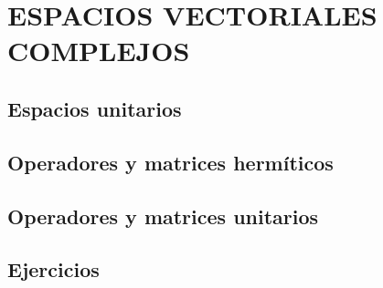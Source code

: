 \chapter[ESPACIOS VECTORIALES COMPLEJOS]{ESPACIOS VECTORIALES \\ COMPLEJOS}\label{chap:espacios_complejos}
\printchaptertableofcontents

\section{Espacios unitarios}

\section{Operadores y matrices hermíticos}

\section{Operadores y matrices unitarios}

\section{Ejercicios}
